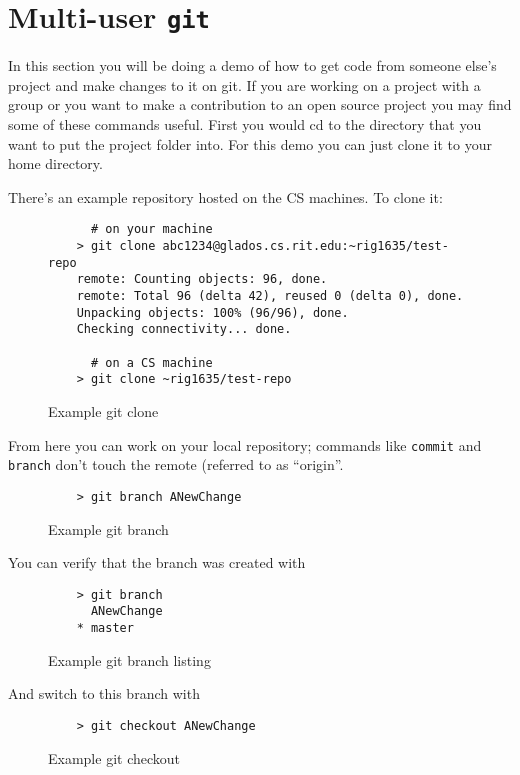 \documentclass[11pt]{report}
\begin{document}
\chapter{Multi-user \texttt{git}}

In this section you will be doing a demo of how to get code from
someone else's project and make changes to it on git. If you are
working on a project with a group or you want to make a contribution
to an open source project you may find some of these commands useful.
First you would cd to the directory that you want to put the project
folder into.  For this demo you can just clone it to your home
directory.

There's an example repository hosted on the CS machines. To clone it:

\begin{figure}[H]
  \caption{Example git clone}
  \begin{lstlisting}
      # on your machine
    > git clone abc1234@glados.cs.rit.edu:~rig1635/test-repo
    remote: Counting objects: 96, done.
    remote: Total 96 (delta 42), reused 0 (delta 0), done.
    Unpacking objects: 100% (96/96), done.
    Checking connectivity... done.

      # on a CS machine
    > git clone ~rig1635/test-repo
  \end{lstlisting}
\end{figure}

From here you can work on your local repository; commands like
\texttt{commit} and \texttt{branch} don't touch the remote (referred
to as ``origin''.

\begin{figure}[H]
  \caption{Example git branch}
  \begin{lstlisting}
    > git branch ANewChange
  \end{lstlisting}
\end{figure}

You can verify that the branch was created with

\begin{figure}[H]
  \caption{Example git branch listing}
  \begin{lstlisting}
    > git branch
      ANewChange
    * master
  \end{lstlisting}
\end{figure}

And switch to this branch with

\begin{figure}[H]
  \caption{Example git checkout}
  \begin{lstlisting}
    > git checkout ANewChange
  \end{lstlisting}
\end{figure}
\end{document}
